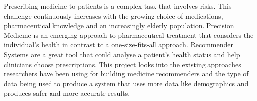 
Prescribing medicine to patients is a complex task that involves risks.
This challenge continuously increases with the growing choice of
medications, pharmaceutical knowledge and an increasingly elderly
population. Precision Medicine is an emerging approach to pharmaceutical
treatment that considers the individual's health in contrast to a
one-size-fits-all approach. Recommender Systems are a great tool that
could analyse a patient's health status and help clinicians choose
prescriptions. This project looks into the existing approaches researchers
have been using for building medicine recommenders and the type of data
being used to produce a system that uses more data like demographics and
produces safer and more accurate results.

